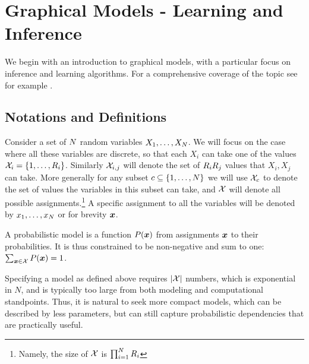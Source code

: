 \section{Graphical Models - Learning and Inference}
We begin with an introduction to graphical models, with a particular focus on inference and learning algorithms. For a comprehensive coverage of the topic see for example \cite{koller2009probabilistic}.
\subsection{Notations and Definitions}
\label{sec:def}
Consider a set of $N$ random variables $X_1,\ldots,X_{N}$. We will focus on the case where all these variables are discrete,  so that each $X_i$ can take one of the values ${\cal X}_i = \{1,\ldots,R_i\}$. Similarly ${\cal X}_{i,j}$ will denote the set of $R_i R_j$ values that $X_i,X_j$ can take. More generally for any subset $c\subseteq \{1,\ldots,N\}$ we will use ${\cal X}_c$ to denote the set of values the variables in this subset can take, and ${\cal X}$ will denote all possible assignments.\footnote{Namely, the size of ${\cal X}$ is $\prod_{i=1}^{N} R_i$} A specific assignment to all the variables will be denoted by $x_1,\ldots,x_{N}$ or for brevity $\boldsymbol{x}$. 

A probabilistic model is a function $P(\boldsymbol{x})$ from assignments $\boldsymbol{x}$ to their probabilities. It is thus constrained to be non-negative and sum to one: $\sum_{\boldsymbol{x} \in {\cal X}} P(\boldsymbol{x}) = 1$.

Specifying a model as defined above requires $|{\cal X}|$ numbers, which is exponential in $N$, and is typically too large from both modeling and computational standpoints. Thus, it is natural to seek more compact models, which can be described by less parameters, but can still capture probabilistic dependencies that are practically useful.

